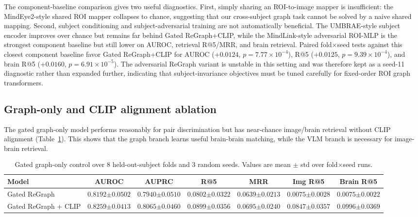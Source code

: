 \documentclass{article}
\begin{document}
The component-baseline comparison gives two useful diagnostics. First, simply sharing an ROI-to-image mapper is insufficient: the MindEye2-style shared ROI mapper collapses to chance, suggesting that our cross-subject graph task cannot be solved by a naive shared mapping. Second, subject conditioning and subject-adversarial training are not automatically beneficial. The UMBRAE-style subject encoder improves over chance but remains far behind Gated ReGraph+CLIP, while the MindLink-style adversarial ROI-MLP is the strongest component baseline but still lower on AUROC, retrieval R@5/MRR, and brain retrieval. Paired fold$\times$seed tests against this closest component baseline favor Gated ReGraph+CLIP for AUROC ($+0.0124$, $p=7.77\times10^{-4}$), R@5 ($+0.0125$, $p=9.39\times10^{-4}$), and brain R@5 ($+0.0160$, $p=6.91\times10^{-5}$). The adversarial ReGraph variant is unstable in this setting and was therefore kept as a seed-11 diagnostic rather than expanded further, indicating that subject-invariance objectives must be tuned carefully for fixed-order ROI graph transformers.

\subsection{Graph-only and CLIP alignment ablation}

The gated graph-only model performs reasonably for pair discrimination but has near-chance image/brain retrieval without CLIP alignment (Table~\ref{tab:graph_only}). This shows that the graph branch learns useful brain-brain matching, while the VLM branch is necessary for image-brain retrieval.

\begin{table}[!htbp]
  \centering
  \caption{Gated graph-only control over 8 held-out-subject folds and 3 random seeds. Values are mean $\pm$ std over fold$\times$seed runs.}
  \label{tab:graph_only}
  \scriptsize
  \setlength{\tabcolsep}{3.5pt}
  \renewcommand{\arraystretch}{1.15}
  \begin{tabular}{lcccccc}
    \toprule
    Model & AUROC & AUPRC & R@5 & MRR & Img R@5 & Brain R@5 \\
    \midrule
    Gated ReGraph
    & $0.8192{\scriptstyle\pm0.0502}$
    & $0.7940{\scriptstyle\pm0.0510}$
    & $0.0802{\scriptstyle\pm0.0322}$
    & $0.0639{\scriptstyle\pm0.0213}$
    & $0.0075{\scriptstyle\pm0.0028}$
    & $0.0075{\scriptstyle\pm0.0022}$ \\
    Gated ReGraph + CLIP
    & $\mathbf{0.8259}{\scriptstyle\pm0.0413}$
    & $\mathbf{0.8065}{\scriptstyle\pm0.0460}$
    & $\mathbf{0.0899}{\scriptstyle\pm0.0356}$
    & $\mathbf{0.0695}{\scriptstyle\pm0.0240}$
    & $\mathbf{0.0847}{\scriptstyle\pm0.0357}$
    & $\mathbf{0.0996}{\scriptstyle\pm0.0369}$ \\
    \bottomrule
  \end{tabular}
\end{table}
\end{document}
